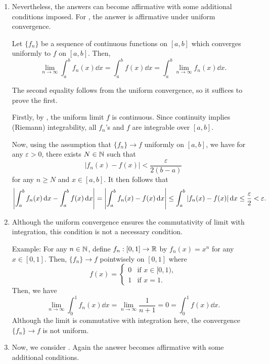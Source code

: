 \begin{enumerate}
\item Nevertheless, the answers can become affirmative with some additional
conditions imposed. For , the answer is
affirmative under uniform convergence.

\begin{proposition}
\label{prp:unif-conv-lim-int-comm}
Let \(\{f_n\}\) be a sequence of continuous functions on \([a,b]\) which
converges uniformly to \(f\) on \([a,b]\). Then,
\[
\lim_{n\to \infty}\int_{a}^{b}f_n(x)\dd{x}
=\int_{a}^{b}f(x)\dd{x}
=\int_{a}^{b}\lim_{n\to \infty}f_n(x)\dd{x}.
\]
\end{proposition}
\begin{pf}
The second equality follows from the uniform convergence, so it suffices to
prove the first.

Firstly, by , the uniform limit \(f\) is continuous. Since continuity implies (Riemann) integrability, all \(f_n\)'s and \(f\) are integrable over \([a,b]\).

Now, using the assumption that \(\{f_n\}\to f\) uniformly on \([a,b]\), we have for any \(\varepsilon>0\), there exists \(N\in\mathbb{N}\) such that
\[
|f_n(x)-f(x)|<\frac{\varepsilon}{2(b-a)}
\]
for any \(n\ge N\) and \(x\in [a,b]\). It then follows that
\[
\qty|\int_{a}^{b}f_n(x)\dd{x}-\int_{a}^{b}f(x)\dd{x}|
=\qty|\int_{a}^{b}f_n(x)-f(x)\dd{x}|
\le\int_{a}^{b}|f_n(x)-f(x)|\dd{x}
\le\frac{\varepsilon}{2}
<\varepsilon.
\]
\end{pf}
\item Although the uniform convergence ensures the commutativity of limit with
integration, this condition is not a necessary condition. 

Example: For any \(n\in\mathbb{N}\), define \(f_n:[0,1]\to\mathbb{R}\) by \(f_n(x)=x^n\) for
any \(x\in [0,1]\). Then, \(\{f_n\}\to f\) pointwisely on \([0,1]\) where
\[f(x)=\begin{cases}
0&\text{if \(x\in [0,1)\)}, \\
1&\text{if \(x=1\)}.
\end{cases}
\]
Then, we have
\[
\lim_{n\to \infty}\int_{0}^{1}f_n(x)\dd{x}
=\lim_{n\to \infty}\frac{1}{n+1}
=0=\int_{0}^{1}f(x)\dd{x}.
\]
Although the limit is commutative with integration here, the convergence
\(\{f_n\}\to f\) is not uniform.

\item Now, we consider . Again the answer becomes
affirmative with some additional conditions.


\end{enumerate}

